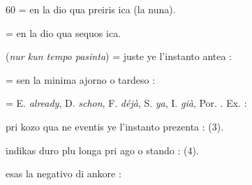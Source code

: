 \begin{VUpage}[64]{60}
 = en la dio qua preiris ica (la nuna).

 = en la dio qua sequos ica.

 (\textit{nur kun tempo pasinta}) = juste ye l'instanto antea :\nl
{}

 = sen la minima ajorno o tardeso : \nl
{}

 = E. \textit{already}, D. \textit{schon}, F. \textit{déjà}, S. \textit{ya}, I. \textit{già}, Por. \textit{}.\nl
Ex. : 

 pri kozo qua ne eventis ye l'instanto prezenta : \nl
{} (3).

 indikas duro plu longa pri ago o stando : \nl
{} (4).

 esas la negativo di ankore : \nl
{}\parplein
\end{VUpage}

